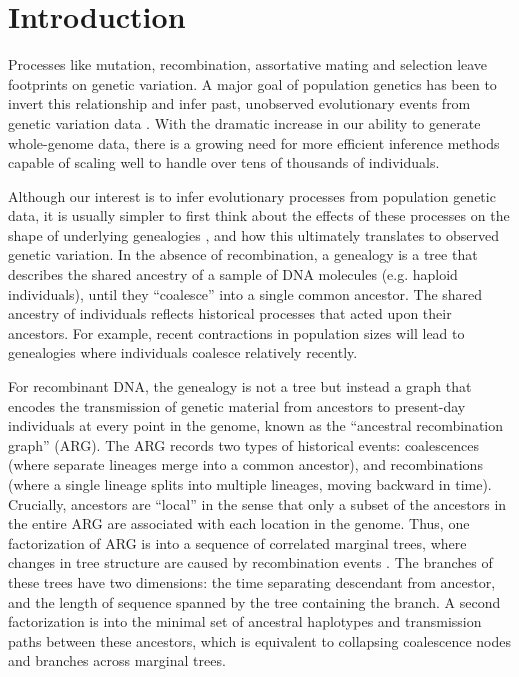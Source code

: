 \section{Introduction}

Processes like mutation, recombination, assortative mating and selection leave footprints on genetic variation.
A major goal of population genetics has been to invert this relationship and infer past, unobserved evolutionary events from genetic variation data \citep{schraiber_methods_2015}.
With the dramatic increase in our ability to generate whole-genome data,
there is a growing need for more efficient inference methods capable of scaling well to handle over tens of thousands of individuals.

Although our interest is to infer evolutionary processes from population genetic data,
it is usually simpler to first think about the effects of these processes on the shape of underlying genealogies \citep{wakely_coalescent_2016},
and how this ultimately translates to observed genetic variation.
In the absence of recombination,
a genealogy is a tree that describes the shared ancestry of a sample of DNA molecules (e.g. haploid individuals),
until they ``coalesce'' into a single common ancestor.
The shared ancestry of individuals reflects historical processes that acted upon their ancestors. 
For example, recent contractions in population sizes will lead to genealogies where individuals coalesce relatively recently.

For recombinant DNA,
the genealogy is not a tree but instead a graph that encodes the transmission of genetic material from ancestors to present-day individuals at every point in the genome,
known as the ``ancestral recombination graph'' (ARG).
The ARG records two types of historical events:
coalescences (where separate lineages merge into a common ancestor),
and recombinations (where a single lineage splits into multiple lineages, moving backward in time).
Crucially, ancestors are ``local'' in the sense that only a subset of the ancestors in the entire ARG are associated with each location in the genome.
Thus, one factorization of ARG is into a sequence of correlated marginal trees,
where changes in tree structure are caused by recombination events \citep{kelleher_efficient_2016, kelleher_inferring_2019, speidel_method_2019}.
The branches of these trees have two dimensions:
the time separating descendant from ancestor,
and the length of sequence spanned by the tree containing the branch.
A second factorization is into the minimal set of ancestral haplotypes and transmission paths between these ancestors,
which is equivalent to collapsing coalescence nodes and branches across marginal trees. 

